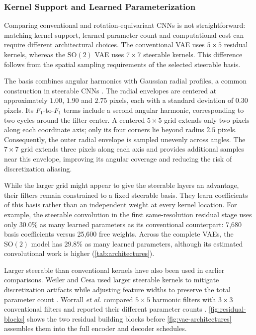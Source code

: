 \documentclass{midl}
\newcommand{\SOtwo}{\mathrm{SO}(2)}
\begin{document}
\subsubsection{Kernel Support and Learned Parameterization}
\label{sec:kernel-support}
Comparing conventional and rotation-equivariant CNNs is not straightforward: matching kernel support, learned parameter count and computational cost can require different architectural choices. The conventional VAE uses $5\times5$ residual kernels, whereas the $\SOtwo$ VAE uses $7\times7$ steerable kernels. This difference follows from the spatial sampling requirements of the selected steerable basis.

The basis combines angular harmonics with Gaussian radial profiles, a common construction in steerable CNNs \cite{weiler_general_2019}. The radial envelopes are centered at approximately $1.00$, $1.90$ and $2.75$ pixels, each with a standard deviation of $0.30$ pixels. Its $F_1$-to-$F_1$ terms include a second angular harmonic, corresponding to two cycles around the filter center. A centered $5\times5$ grid extends only two pixels along each coordinate axis; only its four corners lie beyond radius $2.5$ pixels. Consequently, the outer radial envelope is sampled unevenly across angles. The $7\times7$ grid extends three pixels along each axis and provides additional samples near this envelope, improving its angular coverage and reducing the risk of discretization aliasing.

While the larger grid might appear to give the steerable layers an advantage, their filters remain constrained to a fixed steerable basis. They learn coefficients of this basis rather than an independent weight at every kernel location. For example, the steerable convolution in the first same-resolution residual stage uses only $30.0\%$ as many learned parameters as its conventional counterpart: 7,680 basis coefficients versus 25,600 free weights. Across the complete VAEs, the $\SOtwo$ model has $29.8\%$ as many learned parameters, although its estimated convolutional work is higher (\autoref{tab:architectures}).

Larger steerable than conventional kernels have also been used in earlier comparisons. Weiler and Cesa used larger steerable kernels to mitigate discretization artifacts while adjusting feature widths to preserve the total parameter count \cite{weiler_general_2019}. Worrall \emph{et al.} compared $5\times5$ harmonic filters with $3\times3$ conventional filters and reported their different parameter counts \cite{worrall_harmonic_2017}. \autoref{fig:residual-blocks} shows the two residual building blocks before \autoref{fig:vae-architectures} assembles them into the full encoder and decoder schedules.
\end{document}
